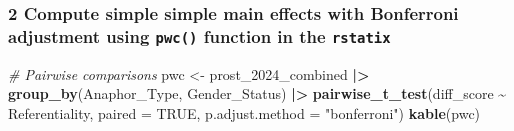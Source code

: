 \documentclass[
  10pt,
]{article}
\newenvironment{Shaded}{\begin{snugshade}}{\end{snugshade}}
\newcommand{\AttributeTok}[1]{\textcolor[rgb]{0.13,0.29,0.53}{#1}}
\newcommand{\CommentTok}[1]{\textcolor[rgb]{0.56,0.35,0.01}{\textit{#1}}}
\newcommand{\ConstantTok}[1]{\textcolor[rgb]{0.56,0.35,0.01}{#1}}
\newcommand{\FunctionTok}[1]{\textcolor[rgb]{0.13,0.29,0.53}{\textbf{#1}}}
\newcommand{\NormalTok}[1]{#1}
\newcommand{\OtherTok}[1]{\textcolor[rgb]{0.56,0.35,0.01}{#1}}
\newcommand{\SpecialCharTok}[1]{\textcolor[rgb]{0.81,0.36,0.00}{\textbf{#1}}}
\newcommand{\StringTok}[1]{\textcolor[rgb]{0.31,0.60,0.02}{#1}}
\begin{document}
\subsubsection{\texorpdfstring{2 Compute simple simple main effects with
Bonferroni adjustment using \texttt{pwc()} function in the
\texttt{rstatix}}{2 Compute simple simple main effects with Bonferroni adjustment using pwc() function in the rstatix}}\label{compute-simple-simple-main-effects-with-bonferroni-adjustment-using-pwc-function-in-the-rstatix}

\begin{Shaded}
\begin{Highlighting}[]
\CommentTok{\# Pairwise comparisons}
\NormalTok{pwc }\OtherTok{\textless{}{-}}\NormalTok{ prost\_2024\_combined }\SpecialCharTok{|\textgreater{}}
  \FunctionTok{group\_by}\NormalTok{(Anaphor\_Type, Gender\_Status) }\SpecialCharTok{|\textgreater{}}
  \FunctionTok{pairwise\_t\_test}\NormalTok{(diff\_score }\SpecialCharTok{\textasciitilde{}}\NormalTok{ Referentiality, }\AttributeTok{paired =} \ConstantTok{TRUE}\NormalTok{, }\AttributeTok{p.adjust.method =} \StringTok{"bonferroni"}\NormalTok{) }
\FunctionTok{kable}\NormalTok{(pwc)}
\end{Highlighting}
\end{Shaded}
\end{document}
